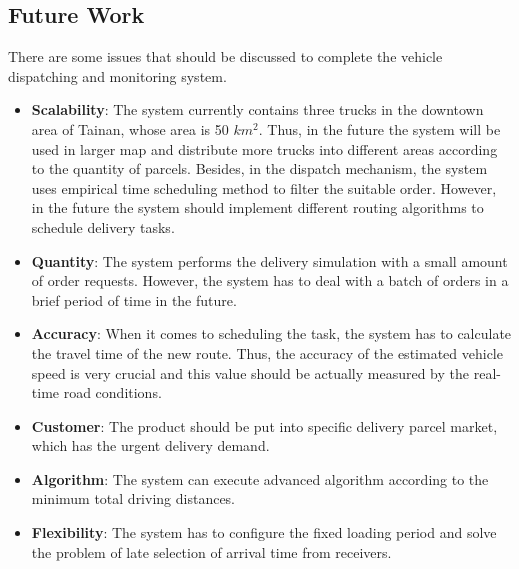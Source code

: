 \documentclass[12pt]{ksthesis}
\begin{document}
\begin{thesis}
{\section{Future Work}

There are some issues that should be discussed to complete the vehicle dispatching and monitoring system.

\begin{itemize}


\item
\textbf{Scalability}: The system currently contains three trucks in the downtown area of Tainan, whose area is 50 $km^{2}$. Thus, in the future the system will be used in larger map and distribute more trucks into different areas according to the quantity of parcels. Besides, in the dispatch mechanism, the system uses empirical time scheduling method to filter the suitable order. However, in the future the system should implement different routing algorithms to schedule delivery tasks.

\item
\textbf{Quantity}: The system performs the delivery simulation with a small amount of order requests. However, the system has to deal with a batch of orders in a brief period of time in the future.

\item
\textbf{Accuracy}: When it comes to scheduling the task, the system has to calculate the travel time of the new route. Thus, the accuracy of the estimated vehicle speed is very crucial and this value should be actually measured by the real-time road conditions.

\item
\textbf{Customer}: The product should be put into specific delivery parcel market, which has the urgent delivery demand.


\item
\textbf{Algorithm}: The system can execute advanced algorithm according to the minimum total driving distances.

\item
\textbf{Flexibility}: The system has to configure the fixed loading period and solve the problem of  late selection of arrival time from receivers.

\end{itemize}


} \end{thesis}

\singlespace {\large



}



\doublespace
\end{document}
